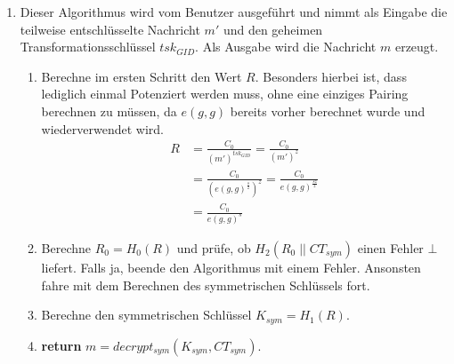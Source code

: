 \begin{enumerate}
	\item {} Dieser Algorithmus wird vom
		Benutzer ausgeführt und nimmt als Eingabe die teilweise entschlüsselte
		Nachricht $m'$ und den geheimen Transformationsschlüssel $tsk_{GID}$. Als
		Ausgabe wird die Nachricht $m$ erzeugt.
		\begin{enumerate}
			\item Berechne im ersten Schritt den Wert $R$. Besonders hierbei ist, dass
				lediglich einmal Potenziert werden muss, ohne eine einziges
				Pairing berechnen zu müssen, da $e(g, g)$ bereits vorher berechnet wurde
				und wiederverwendet wird.
				\begin{align*}
					R &= \frac{C_0}{(m')^{tsk_{GID}}} = \frac{C_0}{(m')^z} \\
						&= \frac{C_0}{\left(e(g, g)^{\frac{s}{z}}\right)^z} =
						\frac{C_0}{e(g, g)^{\frac{sz}{z}}} \\
						&= \frac{C_0}{e(g, g)^s}
				\end{align*}
			\item Berechne $R_0 = H_0(R)$ und prüfe, ob $H_2(R_0 \;||\; CT_{sym})$
				einen Fehler $\bot$ liefert. Falls ja, beende den Algorithmus mit einem
				Fehler. Ansonsten fahre mit dem Berechnen des symmetrischen Schlüssels
				fort.
			\item Berechne den symmetrischen Schlüssel $K_{sym} = H_1(R)$.
			\item \textbf{return} $m = decrypt_{sym}\left(K_{sym}, CT_{sym}\right)$.
		\end{enumerate}
\end{enumerate}

